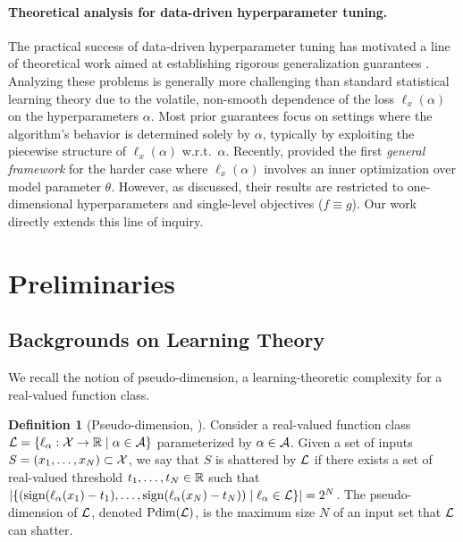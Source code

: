 \documentclass{article}
\theoremstyle{plain}
\theoremstyle{definition}
\newtheorem{definition}[theorem]{Definition}
\theoremstyle{remark}
\begin{document}
\paragraph{Theoretical analysis for data-driven hyperparameter tuning.} The practical success of data-driven hyperparameter tuning has motivated a line of theoretical work aimed at establishing rigorous generalization guarantees \citep{balcan2021much, balcan2021sample, bartlett2022generalization, balcan2023new, balcan2024algorithm}. Analyzing these problems is generally more challenging than standard statistical learning theory due to the volatile, non-smooth dependence of the loss $\ell_x(\alpha)$ on the hyperparameters $\alpha$. Most prior guarantees focus on settings where the algorithm's behavior is determined solely by $\alpha$, typically by exploiting the piecewise structure of $\ell_x(\alpha)$ w.r.t.~$\alpha$. Recently, \citet{balcan2025sample} provided the first \textit{general framework} for the harder case where $\ell_x(\alpha)$ involves an inner optimization over model parameter $\theta$. However, as discussed, their results are restricted to one-dimensional hyperparameters and single-level objectives ($f \equiv g$). Our work directly extends this line of inquiry. 

  

\section{Preliminaries}
\subsection{Backgrounds on Learning Theory}
We recall the notion of \textup{pseudo-dimension}, a learning-theoretic complexity for a real-valued function class. 

\begin{definition}[Pseudo-dimension, \citealp{pollard1984convergence}] \label{def:pseudo-dimension}
    Consider a real-valued function class $\mathcal{L} = \{\ell_{\alpha}: \mathcal{X} \rightarrow \mathbb{R} \mid \alpha \in \mathcal{A}\}$ parameterized by $\alpha \in \mathcal{A}$. Given a set of inputs $S = (x_1, \dots, x_N) \subset \mathcal{X}$, we say that $S$ is shattered by $\mathcal{L}$ if there exists a set of real-valued threshold $t_1, \dots, t_N \in \mathbb{R}$ such that $\left| \{({\text{sign}}(\ell_{\alpha}(x_1) - t_1), \dots, {\text{sign}}(\ell_{\alpha}(x_N) - t_N)) \mid \ell_{\alpha} \in \mathcal{L}\} \right| = 2^N$. The pseudo-dimension of $\mathcal{L}$, denoted $\text{\normalfont Pdim}(\mathcal{L})$, is the maximum size $N$ of an input set that $\mathcal{L}$ can shatter.
\end{definition}
\end{document}
